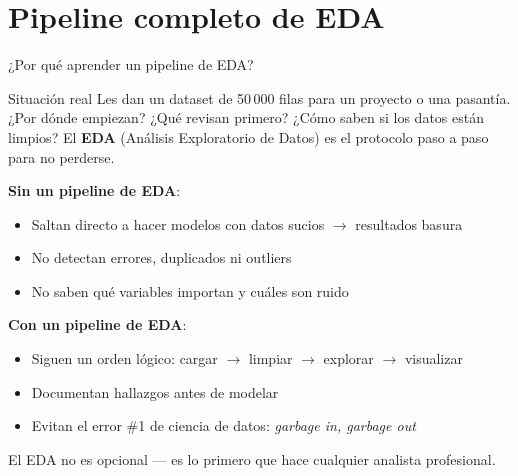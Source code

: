 \documentclass[aspectratio=169, 11pt]{beamer}
\begin{document}
\section{Pipeline completo de EDA}

\begin{frame}{¿Por qué aprender un pipeline de EDA?}
\begin{exampleblock}{Situación real}
Les dan un dataset de 50\,000 filas para un proyecto o una pasant\'ia.
¿Por d\'onde empiezan? ¿Qu\'e revisan primero? ¿C\'omo saben si los datos est\'an limpios?
El \textbf{EDA} (An\'alisis Exploratorio de Datos) es el protocolo paso a paso para no perderse.
\end{exampleblock}

\textbf{Sin un pipeline de EDA}:
\begin{itemize}
\item Saltan directo a hacer modelos con datos sucios $\to$ resultados basura
\item No detectan errores, duplicados ni outliers
\item No saben qu\'e variables importan y cu\'ales son ruido
\end{itemize}

\textbf{Con un pipeline de EDA}:
\begin{itemize}
\item Siguen un orden l\'ogico: cargar $\to$ limpiar $\to$ explorar $\to$ visualizar
\item Documentan hallazgos antes de modelar
\item Evitan el error \#1 de ciencia de datos: \textit{garbage in, garbage out}
\end{itemize}

\vspace{0.3em}
\alert{El EDA no es opcional --- es lo primero que hace cualquier analista profesional.}
\end{frame}
\end{document}
